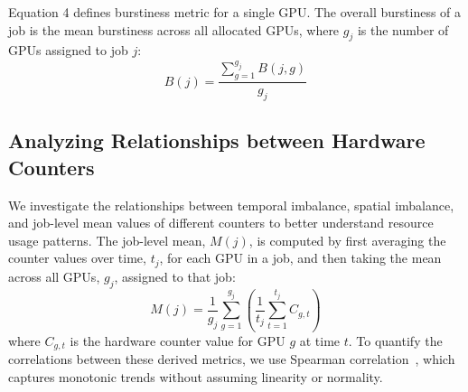 Equation 4 defines burstiness metric for a single GPU.
The overall burstiness of a job is the mean burstiness across all allocated GPUs,
where $g_j$ is the number of GPUs assigned to job $j$:
%
\[
    \mathit{B}(j) = \frac{\sum_{g=1}^{g_j}\mathit{B}(j, g)}{{g_j}}
\]

\subsection{Analyzing Relationships between Hardware Counters}

We investigate the relationships between temporal imbalance, spatial imbalance,
and job-level mean values of different counters to better understand
resource usage patterns. The job-level mean, $\mathit{M}(j)$, is
computed by first averaging
the counter values over time, $t_j$, for each GPU in a job,
and then taking the mean across all GPUs, $g_j$, assigned to that job:
%
\begin{equation}
    \mathit{M}(j) = \frac{1}{g_j} \sum_{g=1}^{g_j} \left( \frac{1}{t_j} \sum_{t=1}^{t_j} C_{g,t} \right)
\end{equation}
%
where $ C_{g,t} $ is the hardware counter value for GPU $g$ at time $t$. To quantify
the correlations between these derived metrics, we use Spearman
correlation~\cite{spearman}, which captures monotonic trends without assuming
linearity or normality.

